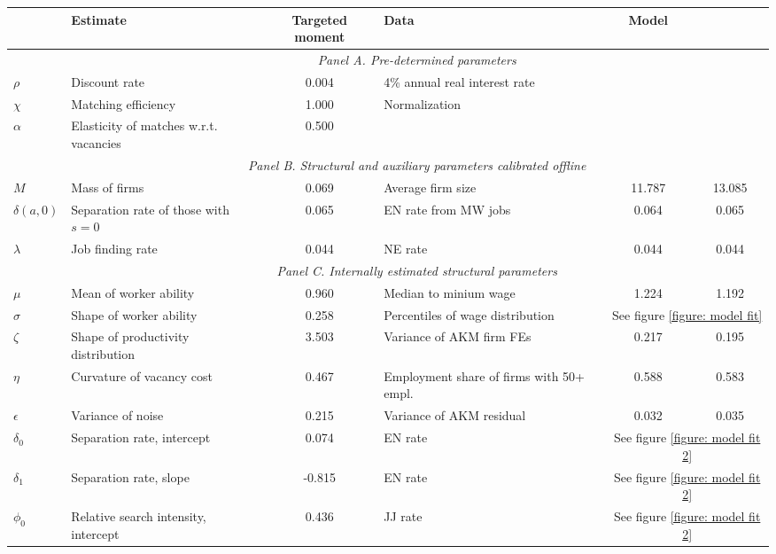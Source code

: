 \begin{tabular}{l l c l c c} \hline \hline \addlinespace[1ex] 
 \multicolumn{2}{l}{Parameter} & Estimate & Targeted moment & Data & Model \\ 
\hline \addlinespace[1.5ex] 
& \multicolumn{5}{c}{\textit{Panel A. Pre-determined parameters}} \\ \cline{2-6} \addlinespace[1ex] 
$\rho$ & Discount rate & 0.004 & 4\% annual real interest rate \\ 
$\chi$ & Matching efficiency & 1.000 & Normalization \\ 
$\alpha$ & Elasticity of matches w.r.t. vacancies & 0.500 & \citet{petrongolopissarides2001} \\ 
\addlinespace[1.5ex] 
& \multicolumn{5}{c}{\textit{Panel B. Structural and auxiliary parameters calibrated offline}} \\ \cline{2-6} \addlinespace[1ex] 
$M$ & Mass of firms & 0.069 & Average firm size & 11.787 & 13.085 \\ 
$\delta(a,0)$ & Separation rate of those with $s=0$ & 0.065 & EN rate from MW jobs & 0.064 & 0.065 \\ 
$\lambda$ & Job finding rate & 0.044 & NE rate & 0.044 & 0.044 \\ 
\addlinespace[1.5ex] 
& \multicolumn{5}{c}{\textit{Panel C. Internally estimated structural parameters}} \\ \cline{2-6} \addlinespace[1ex] 
$\mu$ & Mean of worker ability & 0.960 & Median to minium wage & 1.224 & 1.192 \\ 
$\sigma$ & Shape of worker ability & 0.258 & Percentiles of wage distribution & \multicolumn{2}{c}{See figure \ref{figure: model fit}} \\ 
$\zeta$ & Shape of productivity distribution & 3.503 & Variance of AKM firm FEs & 0.217 & 0.195 \\ 
$\eta$ & Curvature of vacancy cost & 0.467 & Employment share of firms with 50+ empl. & 0.588 & 0.583 \\ 
$\epsilon$ & Variance of noise & 0.215 & Variance of AKM residual & 0.032 & 0.035 \\ 
$\delta_0$ & Separation rate, intercept & 0.074 & EN rate & \multicolumn{2}{c}{See figure \ref{figure: model fit 2}} \\ 
$\delta_1$ & Separation rate, slope & -0.815 & EN rate & \multicolumn{2}{c}{See figure \ref{figure: model fit 2}} \\ 
$\phi_0$ & Relative search intensity, intercept & 0.436 & JJ rate & \multicolumn{2}{c}{See figure \ref{figure: model fit 2}} \\ 

\end{tabular}
